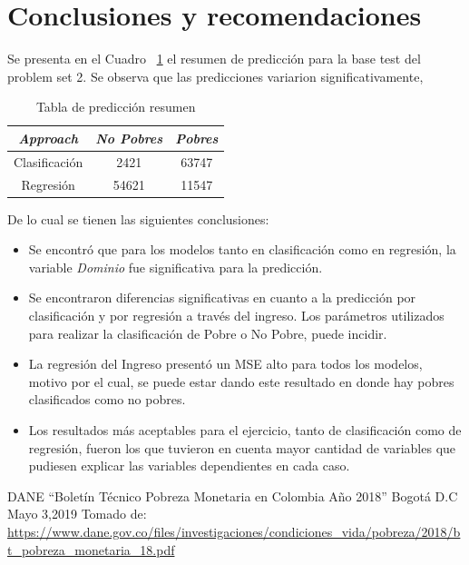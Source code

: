 \documentclass[conference, 10pt]{IEEEtran}
\begin{document}
\section{Conclusiones y recomendaciones}

Se presenta en el Cuadro ~\ref{tab_20} el resumen de predicción para la base test del problem set 2. Se observa que las predicciones variarion significativamente,

\begin{table}[htbp]
\caption{Tabla de predicción resumen}
\begin{center}
\begin{tabular}{|c|c|c|}
\hline
\textbf{\textit{Approach}}&\textbf{\textit{No Pobres}}& \textbf{\textit{Pobres}}\\
\hline
Clasificación&2421&63747\\
\hline
Regresión&54621&11547\\
\hline
\end{tabular}
\label{tab_20}
\end{center}
\end{table}

De lo cual se tienen las siguientes conclusiones:

\begin{itemize}
\item Se encontró que para los modelos tanto en clasificación como en regresión, la variable \textit{Dominio} fue significativa para la predicción.
\item Se encontraron diferencias significativas en cuanto a la predicción por clasificación y por regresión a través del ingreso. Los parámetros utilizados para realizar la clasificación de Pobre o No Pobre, puede incidir.
\item La regresión del Ingreso presentó un MSE alto para todos los modelos, motivo por el cual, se puede estar dando este resultado en donde hay pobres clasificados como no pobres.
\item Los resultados más aceptables para el ejercicio, tanto de clasificación como de regresión, fueron los que tuvieron en cuenta mayor cantidad de variables que pudiesen explicar las variables dependientes en cada caso.
\end{itemize}

\begin{thebibliography}{00}
 DANE “Boletín Técnico Pobreza Monetaria en Colombia Año 2018” Bogotá D.C Mayo 3,2019 Tomado de: \url{https://www.dane.gov.co/files/investigaciones/condiciones_vida/pobreza/2018/bt_pobreza_monetaria_18.pdf}

\end{thebibliography}
\end{document}
